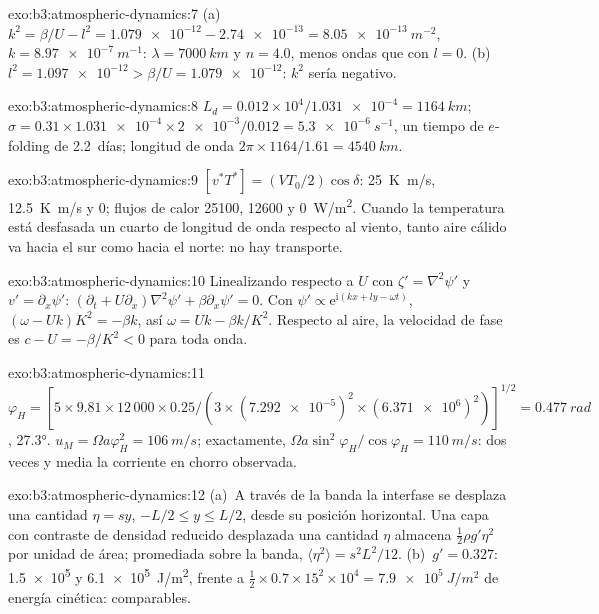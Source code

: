 \begin{solution}{exo:b3:atmospheric-dynamics:7}
(a)~$k^2 = \beta/U - l^2 = \num{1.079e-12} - \num{2.74e-13} =
\qty{8.05e-13}{m^{-2}}$, $k = \qty{8.97e-7}{m^{-1}}$: $\lambda =
\qty{7000}{km}$ y $n = 4.0$, menos ondas que con $l = 0$. (b)~$l^2 =
\num{1.097e-12} > \beta/U = \num{1.079e-12}$: $k^2$ sería negativo.
\end{solution}

\begin{solution}{exo:b3:atmospheric-dynamics:8}
$L_d = 0.012\times10^4/\num{1.031e-4} = \qty{1164}{km}$; $\sigma =
0.31\times\num{1.031e-4}\times\num{2e-3}/0.012 = \qty{5.3e-6}{s^{-1}}$, un
tiempo de $e$-folding de \num{2.2}~días; longitud de onda $2\pi\times1164/1.61 =
\qty{4540}{km}$.
\end{solution}

\begin{solution}{exo:b3:atmospheric-dynamics:9}
$[v^*T^*] = (VT_0/2)\cos\delta$: \qty{25}{K.m/s}, \qty{12.5}{K.m/s} y 0;
flujos de calor \num{25100}, \num{12600} y \qty{0}{W/m^2}. Cuando la
temperatura está desfasada un cuarto de longitud de onda respecto al viento, tanto
aire cálido va hacia el sur como hacia el norte: no hay transporte.
\end{solution}

\begin{solution}{exo:b3:atmospheric-dynamics:10}
Linealizando respecto a $U$ con $\zeta' = \nabla^2\psi'$ y $v' =
\partial_x\psi'$: $(\partial_t + U\partial_x)\nabla^2\psi' + \beta\partial_x
\psi' = 0$. Con $\psi' \propto \mathrm e^{\mathrm i(kx + ly - \omega t)}$,
$(\omega - Uk)K^2 = -\beta k$, así $\omega = Uk - \beta k/K^2$. Respecto
al aire, la velocidad de fase es $c - U = -\beta/K^2 < 0$ para toda onda.
\end{solution}

\begin{solution}{exo:b3:atmospheric-dynamics:11}
$\varphi_H = [5\times9.81\times12\,000\times0.25/(3\times(\num{7.292e-5})^2
\times(\num{6.371e6})^2)]^{1/2} = \qty{0.477}{rad}$, \ang{27.3}.
$u_M = \Omega a\varphi_H^2 = \qty{106}{m/s}$; exactamente, $\Omega a\sin^2
\varphi_H/\cos\varphi_H = \qty{110}{m/s}$: dos veces y media la
corriente en chorro observada.
\end{solution}

\begin{solution}{exo:b3:atmospheric-dynamics:12}
(a)~A través de la banda la interfase se desplaza una cantidad $\eta = sy$, $-L/2 \le y
\le L/2$, desde su posición horizontal. Una capa con contraste de densidad reducido
desplazada una cantidad $\eta$ almacena $\tfrac12\rho g'\eta^2$ por unidad de área; promediada
sobre la banda, $\langle\eta^2\rangle = s^2L^2/12$. (b)~$g' = 0.327$:
\num{1.5e5} y \qty{6.1e5}{J/m^2}, frente a $\tfrac12\times0.7\times15^2
\times10^4 = \qty{7.9e5}{J/m^2}$ de energía cinética: comparables.
\end{solution}

